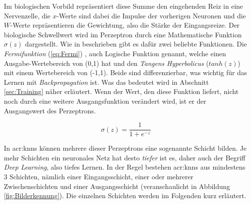 Im biologischen Vorbild repräsentiert diese Summe den eingehenden Reiz in eine Nervenzelle, die \(x\)-Werte sind dabei die Impulse der vorherigen Neuronen und die \(W\)-Werte repräsentieren die Gewichtung, also die Stärke der Eingangsreize. Der biologische Schwellwert wird im Perzeptron durch eine Mathematische Funktion \(\sigma(z)\) dargestellt. Wie in \cite{bib:NeuronaleNetze} beschrieben gibt es dafür zwei beliebte Funktionen. Die \textit{Fermifunktion} (\ref{eq:Fermi}) , auch Logische Funktion genannt, welche einen Ausgabe-Wertebereich von (0,1) hat und den \textit{Tangens Hyperbolicus} (\(tanh(z)\)) mit einem Wertebereich von (-1,1). Beide sind differenzierbar, was wichtig für das Lernen mit \textit{Backpropagation} ist. Was das bedeutet wird in Abschnitt \ref{sec:Training} näher erläutert. Wenn der Wert, den diese Funktion liefert, nicht noch durch eine weitere Ausgangsfunktion verändert wird, ist er der Ausgangswert des Perzeptrons.

\begin{equation}
\sigma(z) = \frac{1}{1 + e^{-z}}
\label{eq:Fermi}
\end{equation}

In \acrshort{acr:knn}s können mehrere dieser Perzeptrons eine sogenannte Schicht bilden. Je mehr Schichten ein neuronales Netz hat desto \textit{tiefer} ist es, daher auch der Begriff \textit{Deep Learning}, also tiefes Lernen. In der Regel bestehen \acrshort{acr:knn}s aus mindestens 3 Schichten, nämlich einer Eingangsschicht, einer oder mehrerer Zwischenschichten und einer Ausgangsschicht (veranschaulicht in Abbildung \ref{fig:Bilderkennung}). Die einzelnen Schichten werden im Folgenden kurz erläutert.  

